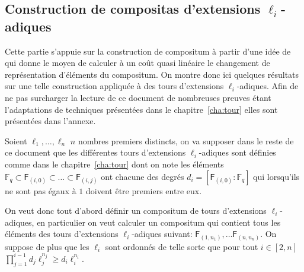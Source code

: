 \documentclass[10pt,a4paper]{book}
\theoremstyle{plain}
\theoremstyle{definition}
\theoremstyle{definition}
\theoremstyle{definition}
\theoremstyle{definition}
\theoremstyle{remark}
\theoremstyle{remark}
\theoremstyle{definition}
\begin{document}
\subsection{Construction de compositas d'extensions $\ell_i$-adiques}
\label{sub:con:com}

Cette partie s'appuie sur la construction de compositum à partir d'une idée de
\cite{DeFeoDoliskaniSchost14} qui donne le moyen de calculer à un coût quasi 
linéaire le changement de représentation d'éléments du compositum. On montre 
donc ici quelques résultats sur une telle construction appliquée à des tours 
d'extensions $\ell_i$-adiques. Afin de ne pas surcharger la lecture de ce 
document de nombreuses preuves étant l'adaptations de techniques présentées 
dans le chapitre~\ref{cha:tour} elles sont présentées dans l'annexe.

Soient $\ell_1, \dots, \ell_n$ $n$ nombres premiers distincts, 
on va supposer dans le reste de ce document que les différentes tours 
d'extensions $\ell_i$-adiques sont définies comme dans le 
chapitre~\ref{cha:tour} dont on note les éléments 
$\mathbb{F}_q \subset \mathsf{F}_{(i,0)} \subset \dots \subset  \mathsf{F}_{(i,j)}$ 
ont chacune des degrés $d_i=[\mathsf{F}_{(i,0)}:\mathbb{F}_q]$ qui lorsqu'ils 
ne sont pas égaux à $1$ doivent être premiers entre eux.

On veut donc tout d'abord définir un compositum de tours d'extensions 
$\ell_i$-adiques, en particulier on veut calculer un compositum qui contient 
tous les éléments des tours d'extensions $\ell_i$-adiques suivant:
$\mathsf{F}_{(1,n_1)}, \dots \mathsf{F}_{(n,n_n)}$. On suppose de plus que les
$\ell_i$ sont ordonnés de telle sorte que pour tout $i \in [2,n]$ 
$\prod_{j=1}^{i-1}d_j\ell_j^{n_j} \geqslant d_i\ell_i^{n_i}$.
\end{document}
